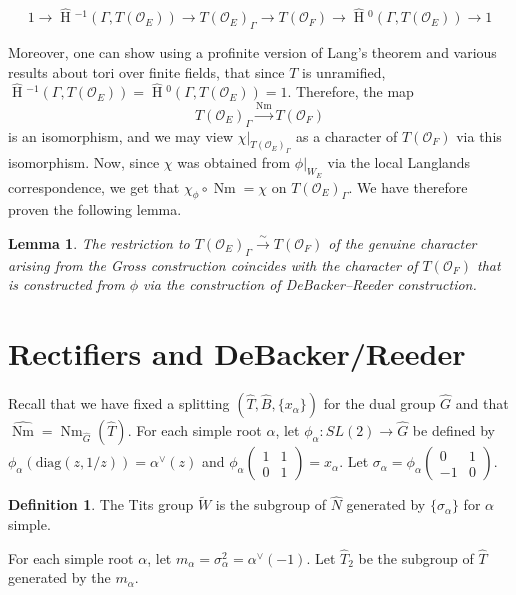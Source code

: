 \documentclass[11pt]{amsart}
\theoremstyle{plain}
\newtheorem{lemma}[theorem]{Lemma}
\newcommand{\HT}[1]{\hat{\HH}{}^{#1}}
\theoremstyle{definition}
\newtheorem{definition}[theorem]{Definition}
\DeclareMathOperator{\HH}{H}
\DeclareMathOperator{\Nm}{Nm}
\newcommand{\mat}[4]{\left( \begin{array}{cc} {#1} & {#2} \\ {#3} & {#4}
\end{array} \right)}
\begin{document}
$$1 \rightarrow \HT{-1}(\Gamma, T(\mathcal{O}_E)) \rightarrow T(\mathcal{O}_E)_{\Gamma}
  \rightarrow T(\mathcal{O}_F) \rightarrow \HT{0}(\Gamma, T(\mathcal{O}_E)) \rightarrow 1$$

Moreover, one can show using a profinite version of Lang's theorem and
various results about tori over finite fields, that since $T$ is unramified,
$\HT{-1}(\Gamma, T(\mathcal{O}_E)) = \HT{0}(\Gamma, T(\mathcal{O}_E)) = 1$.
Therefore, the map
$$T(\mathcal{O}_E)_{\Gamma} \xrightarrow{\Nm} T(\mathcal{O}_F)$$
is an isomorphism, and we may view
$\chi|_{T(\mathcal{O}_E)_{\Gamma}}$ as a character of
$T(\mathcal{O}_F)$ via this isomorphism.  Now, since $\chi$ was
obtained from $\phi|_{W_E}$ via the local Langlands correspondence, we
get that $\chi_{\phi} \circ \Nm = \chi$ on $T(\mathcal{O}_E)_{\Gamma}$.
We have therefore proven the following lemma.

\begin{lemma}\label{grossanddebackerreedercompatibility}
  The restriction to $T(\mathcal{O}_E)_{\Gamma} \xrightarrow{\sim} T(\mathcal{O}_F)$
  of the genuine character arising from the Gross construction
  coincides with the character of $T(\mathcal{O}_F)$ that is
  constructed from $\phi$ via the construction of DeBacker--Reeder
  construction.
\end{lemma}

\section{Rectifiers and DeBacker/Reeder}\label{mainresults}

Recall that we have fixed a splitting $(\hat{T}, \hat{B}, \{x_{\alpha} \})$
for the dual group $\hat{G}$ and that $\hat{\Nm} = \Nm_{\hat{G}}(\hat{T})$.
For each simple root $\alpha$, let $\phi_{\alpha} : SL(2) \rightarrow \hat{G}$
be defined by $\phi_{\alpha}(\mathrm{diag}(z,1/z)) = \alpha^{\vee}(z)$
and $\phi_{\alpha}\mat{1}{1}{0}{1} = x_{\alpha}$. Let
$\sigma_{\alpha} = \phi_{\alpha}\mat{0}{1}{-1}{0}$.

\begin{definition}
  The Tits group $\widetilde{W}$ is the subgroup of $\hat{N}$
  generated by $\{\sigma_{\alpha} \}$ for $\alpha$ simple.
\end{definition}

For each simple root $\alpha$, let $m_{\alpha} = \sigma_{\alpha}^2 = \alpha^{\vee}(-1)$.
Let $\hat{T}_2$ be the subgroup of $\hat{T}$ generated by the $m_{\alpha}$.
\end{document}
